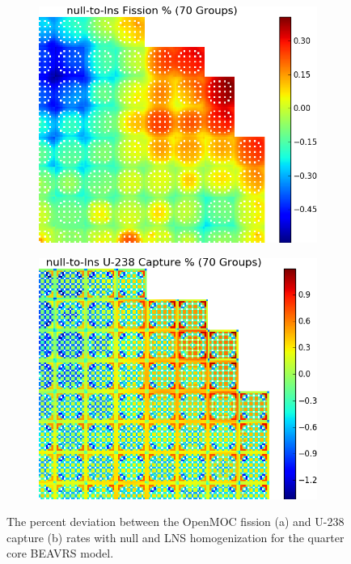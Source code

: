 \begin{appendices}
\clearpage

\begin{figure}[h!]
\centering
\begin{subfigure}{0.78\textwidth}
  \centering
  \includegraphics[width=\linewidth]{figures/patterns/appendix/compare-full-core/null-to-lns/fiss-comp}  	 
  \caption{}
  \label{fig:compare-null-lns-fiss}
\end{subfigure}
\begin{subfigure}{0.78\textwidth}
  \centering
  \includegraphics[width=\linewidth]{figures/patterns/appendix/compare-full-core/null-to-lns/capt-comp}  	
  \caption{}
  \label{fig:compare-null-lns-capt}
\end{subfigure}
\caption[U-238 capture rate null-to-LNS relative deviation]{The percent deviation between the OpenMOC fission (a) and U-238 capture (b) rates with null and \ac{LNS} homogenization for the quarter core \ac{BEAVRS} model.}
\label{fig:null-to-lns-full-core-dev}
\end{figure}


\end{appendices}
